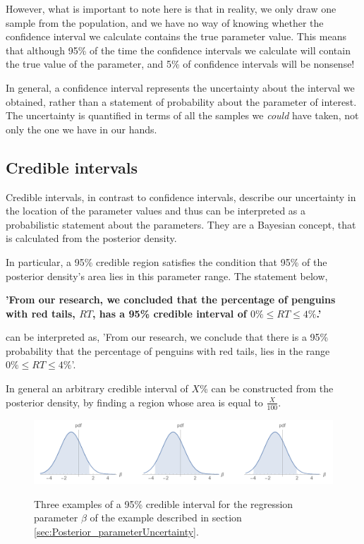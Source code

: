 \documentclass[11pt,fullpage]{book}
\begin{document}
However, what is important to note here is that in reality, we only draw one sample from the population, and we have no way of knowing whether the confidence interval we calculate contains the true parameter value. This means that although 95\% of the time the confidence intervals we calculate will contain the true value of the parameter, and 5\% of confidence intervals will be nonsense! 

In general, a confidence interval represents the uncertainty about the interval we obtained, rather than a statement of probability about the parameter of interest. The uncertainty is quantified in terms of all the samples we \textit{could}
have taken, not only the one we have in our hands.

\subsection{Credible intervals}
Credible intervals, in contrast to confidence intervals, describe our uncertainty in the location of the parameter values and thus can be interpreted as a probabilistic statement about the parameters. They are a Bayesian concept, that is calculated from the posterior density.

In particular, a 95\% credible region satisfies the condition that 95\% of the posterior density's area lies in this parameter range. The statement below,

\textbf{'From our research, we concluded that the percentage of penguins with red tails, $RT$, has a 95\% credible interval of $0\%\leq RT \leq 4\%$.'}

can be interpreted as, 'From our research, we conclude that there is a 95\% probability that the percentage of penguins with red tails, lies in the range $0\%\leq RT \leq 4\%$'.

In general an arbitrary credible interval of $X$\% can be constructed from the posterior density, by finding a region whose area is equal to $\frac{X}{100}$. 

\begin{figure}
\centering
\scalebox{0.35} 
{\includegraphics{Posterior_infiniteCredibleIntervals.pdf}}
\caption{Three examples of a 95\% credible interval for the regression parameter $\beta$ of the example described in section \ref{sec:Posterior_parameterUncertainty}.}\label{fig:Posterior_infiniteCredibleIntervals}
\end{figure}
\end{document}
